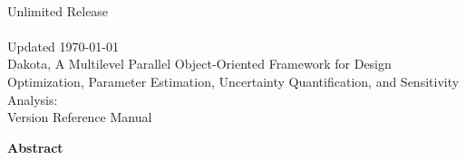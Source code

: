 \documentclass[letterpaper]{book}
\begin{document}
\begin{titlepage}
\setcounter{page}{3}
\begin{center}
{\large \DakotaSANDRef}\\
{\large Unlimited Release}\\
{\large \DakotaSANDDate}\\
{\large Updated \today}\\

\vspace*{1.5cm}
{\LARGE Dakota, A Multilevel Parallel Object-Oriented Framework for 
Design Optimization, Parameter Estimation, Uncertainty Quantification, 
and Sensitivity Analysis:\\Version \DakotaVersion\space Reference Manual}\\
\vspace*{1cm}

\DakotaAuthorFormatted

\pagebreak

{\Large \bf Abstract}
\end{center}

\DakotaAbstractShared
\DakotaAbstractRef

\end{titlepage}

\cleardoublepage
\tableofcontents
\cleardoublepage
\end{document}
